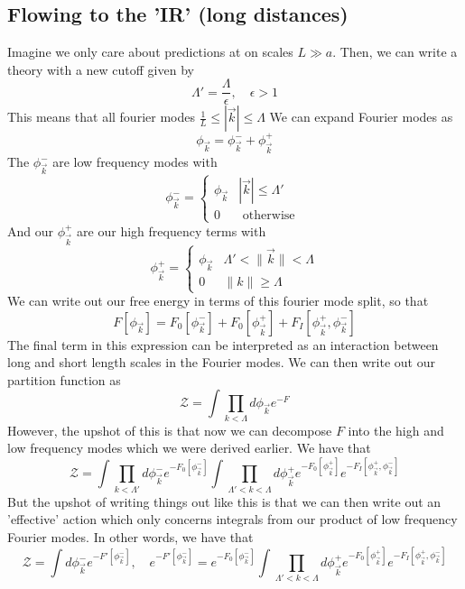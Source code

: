 \subsection{Flowing to the 'IR' (long distances)} 
Imagine we only care about predictions at on scales
$ L \gg a $. Then, we can write a theory 
with a new cutoff given by 
\[
 \Lambda' = \frac{ \Lambda }{ \epsilon }, \quad \epsilon > 1 
\] This means that all fourier modes $ \frac{1}{ L } \leq | \vec{k} | \leq \Lambda $
We can expand Fourier modes as 
\[
\phi_{ \vec{k} }  = \phi_{\vec{k}}^-  + \phi_{ \vec{k} } ^ + 
\] The $ \phi_{ \vec{k} }^-$ are low frequency modes with 
\[
 \phi_{ \vec{k} }^ -  = \begin{cases}
	 \phi_{ \vec{k} } &  | \vec{k} | \leq \Lambda ' \\
	 0 & \text{ otherwise }
 \end{cases}
\] And our $ \phi_{ \vec{k} } ^ + $ are our high frequency 
terms with 
\[
 \phi_{ \vec{k} }^  +  = \begin{cases}
	 \phi_{ \vec{k}  } & \Lambda ' < \| \vec{k} \| < \Lambda \\
	 0 & \| k \| \geq \Lambda 
 \end{cases}
\]  
We can write out our free energy 
in terms of this fourier mode split, so that 
\[
	F [ \phi _{ \vec{k}  } ] = F_ 0 [ \phi_{ \vec{k} }^ - ]  + F_ 0 [ \phi_{ \vec{k} } ^ +   ] + F_ I [ \phi_{ \vec{k} } ^ + , \phi_{ \vec{k} } ^ - ]  
\]  The final term in this expression can be 
interpreted as an interaction between long and short length scales 
in the Fourier modes. 
We can then write out our partition function as
\[
	\mathcal{ Z} =  \int \prod_{ k <  \Lambda  } d \phi_{ \vec{k}} e^{  - F }  
\] However, the upshot of this is that 
now we can decompose $ F $ into the high and low frequency modes 
which we were derived earlier.
We have that
\[
	\mathcal{ Z } = \int \prod_{ k <  \Lambda ' } d \phi_{ \vec{k} }^- e^{  - F_0 [ \phi _{ \vec{k}} ^-]} \int \prod_{ \Lambda ' <  k < \Lambda} d \phi_{ \vec{k} } ^ + e^{  - F_ 0 [ \phi_{ \vec{k} } ^ +  ] } e^{  - F_ I [ \phi_{ \vec{k} } ^ + , \phi_{ \vec{k} } ^ - ]}
\] But the upshot of writing things out 
like this is that we can then write out an 'effective' 
action which only concerns integrals 
from our product of low frequency Fourier modes. In 
other words, we have that 
\[
	\mathcal{ Z } = \int d \phi_{ \vec{k}  } ^ - e^{  -F' [ \phi_{ \vec{k} } ^ -  ] }, \quad e^{  - F' [ \phi_{ \vec{k} } ^ - ]} = e^{ - F_ 0 [ \phi_{ \vec{k} } ^ -  ] } \int \prod_{ \Lambda ' < k < \Lambda } d \phi_{ \vec{k} } ^ +   e^{  - F_ 0 [ \phi_{ \vec{k} } ^ +  ] } e^{  - F_ I [ \phi_{ \vec{k} } ^ + , \phi_{ \vec{k} } ^ - ]}
\] 

